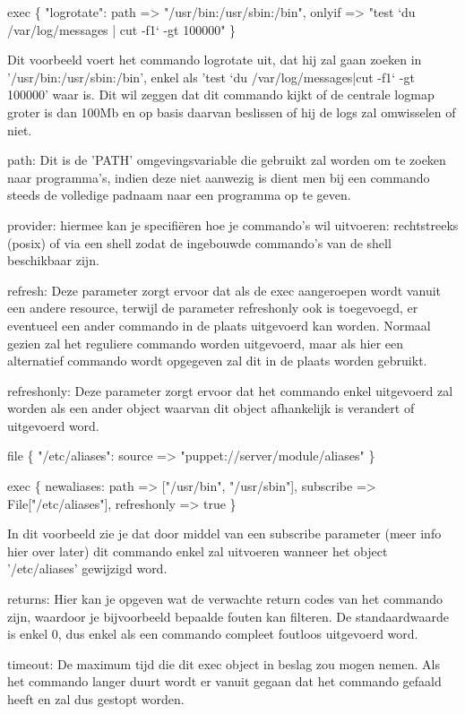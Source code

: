 			exec \{ "logrotate":
				path => "/usr/bin:/usr/sbin:/bin",
				onlyif => "test `du /var/log/messages | cut -f1` -gt 100000"
			\}

		Dit voorbeeld voert het commando logrotate uit, dat hij zal gaan zoeken in '/usr/bin:/usr/sbin:/bin', enkel als 'test `du /var/log/messages|cut -f1` -gt 100000' waar is.
		Dit wil zeggen dat dit commando kijkt of de centrale logmap groter is dan 100Mb en op basis daarvan beslissen of hij de logs zal omwisselen of niet.

		path:
		Dit is de 'PATH' omgevingsvariable die gebruikt zal worden om te zoeken naar programma's, indien deze niet aanwezig is dient men bij een commando steeds de volledige padnaam naar een programma op te geven.

		provider:
		hiermee kan je specifi\"{e}ren hoe je commando's wil uitvoeren: rechtstreeks (posix) of via een shell zodat de ingebouwde commando's van de shell beschikbaar zijn.

		refresh:
		Deze parameter zorgt ervoor dat als de exec aangeroepen wordt vanuit een andere resource, terwijl de parameter refreshonly ook is toegevoegd, er eventueel een ander commando in de plaats uitgevoerd kan worden.
		Normaal gezien zal het reguliere commando worden uitgevoerd, maar als hier een alternatief commando wordt opgegeven zal dit in de plaats worden gebruikt.

		refreshonly:
		Deze parameter zorgt ervoor dat het commando enkel uitgevoerd zal worden als een ander object waarvan dit object afhankelijk is verandert of uitgevoerd word.

			file \{ "/etc/aliases":
				source => "puppet://server/module/aliases"
			\}

			exec \{ newaliases:
				path => ["/usr/bin", "/usr/sbin"],
				subscribe => File["/etc/aliases"],
				refreshonly => true
			\}

		In dit voorbeeld zie je dat door middel van een subscribe parameter (meer info hier over later) dit commando enkel zal uitvoeren wanneer het object '/etc/aliases' gewijzigd word.

		returns:
		Hier kan je opgeven wat de verwachte return codes van het commando zijn, waardoor je bijvoorbeeld bepaalde fouten kan filteren.
		De standaardwaarde is enkel 0, dus enkel als een commando compleet foutloos uitgevoerd word.

		timeout:
		De maximum tijd die dit exec object in beslag zou mogen nemen.
		Als het commando langer duurt wordt er vanuit gegaan dat het commando gefaald heeft en zal dus gestopt worden.

